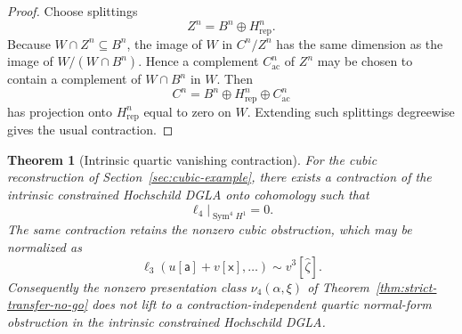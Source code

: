 \documentclass[11pt]{amsart}
\newtheorem{theorem}{Theorem}[section]
\begin{document}
\begin{proof}
Choose splittings
\[
Z^n=B^n\oplus H^n_{\mathrm{rep}}.
\]
Because $W\cap Z^n\subseteq B^n$, the image of $W$ in $C^n/Z^n$ has the same dimension as the image of $W/(W\cap B^n)$.  Hence a complement $C^n_{\mathrm{ac}}$ of $Z^n$ may be chosen to contain a complement of $W\cap B^n$ in $W$.  Then
\[
C^n=B^n\oplus H^n_{\mathrm{rep}}\oplus C^n_{\mathrm{ac}}
\]
has projection onto $H^n_{\mathrm{rep}}$ equal to zero on $W$.  Extending such splittings degreewise gives the usual contraction.
\end{proof}

\begin{theorem}[Intrinsic quartic vanishing contraction]\label{thm:intrinsic-ell4-vanish}
For the cubic reconstruction of Section~\ref{sec:cubic-example}, there exists a contraction of the intrinsic constrained Hochschild DGLA onto cohomology such that
\[
\boxed{
\ell_4\big|_{\operatorname{Sym}^4H^1}=0.
}
\]
The same contraction retains the nonzero cubic obstruction, which may be normalized as
\[
\ell_3(u[\mathsf a]+v[\mathsf x],\ldots)
\sim v^3[\widehat\zeta].
\]
Consequently the nonzero presentation class $\nu_4(\alpha,\xi)$ of
Theorem~\ref{thm:strict-transfer-no-go} does not lift to a contraction-independent quartic normal-form obstruction in the intrinsic constrained Hochschild DGLA.
\end{theorem}
\end{document}
